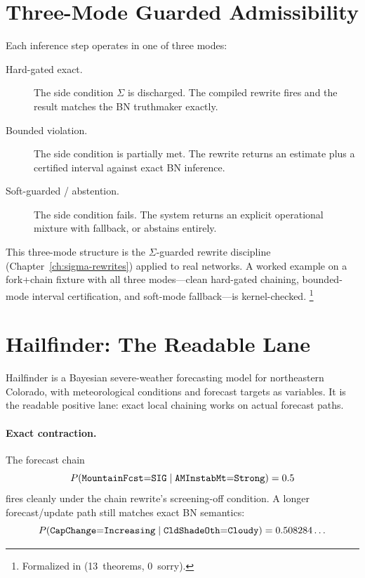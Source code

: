 \documentclass[11pt,openany]{report}
\begin{document}
\section{Three-Mode Guarded Admissibility}

Each inference step operates in one of three modes:

\begin{description}
\item[Hard-gated exact.] The side condition $\Sigma$ is
  discharged.  The compiled rewrite fires and the result matches
  the BN truthmaker exactly.

\item[Bounded violation.] The side condition is partially met.
  The rewrite returns an estimate plus a certified interval
  against exact BN inference.

\item[Soft-guarded / abstention.] The side condition fails.
  The system returns an explicit operational mixture with
  fallback, or abstains entirely.
\end{description}

\noindent
This three-mode structure is the $\Sigma$-guarded rewrite
discipline (Chapter~\ref{ch:sigma-rewrites}) applied to real
networks.  A worked example on a fork+chain fixture with all
three modes---clean hard-gated chaining, bounded-mode interval
certification, and soft-mode fallback---is kernel-checked.%
\footnote{Formalized in
(13~theorems, 0~sorry).}


\section{Hailfinder: The Readable Lane}

Hailfinder is a Bayesian severe-weather forecasting model for
northeastern Colorado, with meteorological conditions and forecast
targets as variables.  It is the readable positive lane: exact
local chaining works on actual forecast paths.

\paragraph{Exact contraction.}
The forecast chain
\[
  P(\texttt{MountainFcst}{=}\texttt{SIG} \mid
    \texttt{AMInstabMt}{=}\texttt{Strong}) = 0.5
\]
fires cleanly under the chain rewrite's screening-off condition.
A longer forecast/update path still matches exact BN semantics:
\[
  P(\texttt{CapChange}{=}\texttt{Increasing} \mid
    \texttt{CldShadeOth}{=}\texttt{Cloudy}) = 0.508284\ldots
\]
\end{document}
